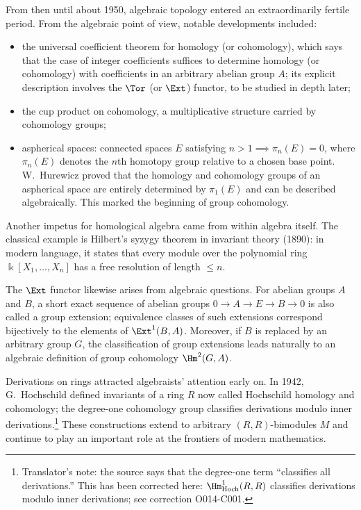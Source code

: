 From then until about 1950, algebraic topology entered an extraordinarily fertile period. From the algebraic point of view, notable developments included:
\begin{itemize}
	\item the universal coefficient theorem for homology (or cohomology), which says that the case of integer coefficients suffices to determine homology (or cohomology) with coefficients in an arbitrary abelian group $A$; its explicit description involves the $\Tor$ (or $\Ext$) functor, to be studied in depth later;
	\item the cup product on cohomology, a multiplicative structure carried by cohomology groups;
	\item aspherical spaces: connected spaces $E$ satisfying $n>1\implies\pi_n(E)=0$, where $\pi_n(E)$ denotes the $n$th homotopy group relative to a chosen base point. W.\ Hurewicz proved that the homology and cohomology groups of an aspherical space are entirely determined by $\pi_1(E)$ and can be described algebraically. This marked the beginning of group cohomology.
\end{itemize}

Another impetus for homological algebra came from within algebra itself. The classical example is Hilbert's syzygy theorem in invariant theory (1890): in modern language, it states that every module over the polynomial ring $\Bbbk[X_1,\ldots,X_n]$ has a free resolution of length $\leq n$.

The $\Ext$ functor likewise arises from algebraic questions. For abelian groups $A$ and $B$, a short exact sequence of abelian groups $0\to A\to E\to B\to0$ is also called a group extension; equivalence classes of such extensions correspond bijectively to the elements of $\Ext^1(B,A)$. Moreover, if $B$ is replaced by an arbitrary group $G$, the classification of group extensions leads naturally to an algebraic definition of group cohomology $\Hm^2(G,A)$.

Derivations on rings attracted algebraists' attention early on. In 1942, G.\ Hochschild defined invariants of a ring $R$ now called Hochschild homology and cohomology; the degree-one cohomology group classifies derivations modulo inner derivations.\footnote{Translator's note: the source says that the degree-one term ``classifies all derivations.'' This has been corrected here: $\Hm^1_{\mathrm{Hoch}}(R,R)$ classifies derivations modulo inner derivations; see correction O014-C001.} These constructions extend to arbitrary $(R,R)$-bimodules $M$ and continue to play an important role at the frontiers of modern mathematics.

